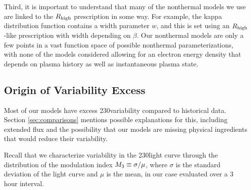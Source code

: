 Third, it is important to understand that many of the nonthermal models we use are linked to the $R_\mathrm{high}$ prescription in some way.  For example, the kappa distribution function contains a width parameter $w$, and this is set using an $R_\mathrm{high}$-like prescription with width depending on $\beta$.  Our nonthermal models are only a few points in a vast function space of possible nonthermal parameterizations, with none of the models considered allowing for an electron energy density that depends on plasma history as well as instantaneous plasma state.

\subsection{Origin of Variability Excess}

Most of our models have excess 230\GHz variability compared to historical data.
Section \ref{sec:comparisons} mentions possible explanations for this, including extended flux and the possibility that our models are missing physical ingredients that would reduce their variability.

Recall that we characterize variability in the 230\GHz light curve through the distribution of the modulation index $M_{3} \equiv \sigma/\mu$, where $\sigma$ is the standard deviation of the light curve and $\mu$ is the mean, in our case evaluated over a 3 hour interval.

